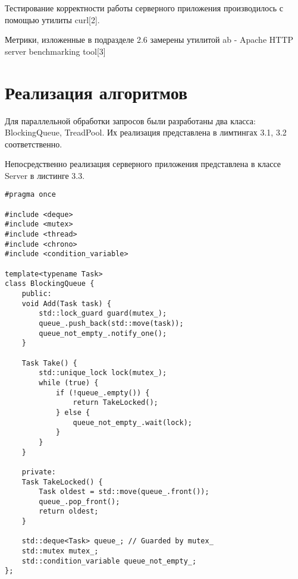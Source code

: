 Тестирование корректности работы серверного приложения производилось с помощью утилиты curl[2].

Метрики, изложенные в подразделе 2.6 замерены утилитой ab - Apache HTTP server benchmarking tool[3]

\section{Реализация алгоритмов}

Для параллельной обработки запросов были разработаны два класса: BlockingQueue, TreadPool. Их реализация представлена в лимтингах 3.1, 3.2 соответственно.

Непосредственно реализация серверного приложения представлена в классе Server в листинге 3.3. 

\begin{lstlisting}[caption=Реализация блокирующей очереди]
#pragma once

#include <deque>
#include <mutex>
#include <thread>
#include <chrono>
#include <condition_variable>

template<typename Task>
class BlockingQueue {
	public:
	void Add(Task task) {
		std::lock_guard guard(mutex_);
		queue_.push_back(std::move(task));
		queue_not_empty_.notify_one();
	}
	
	Task Take() {
		std::unique_lock lock(mutex_);
		while (true) {
			if (!queue_.empty()) {
				return TakeLocked();
			} else {
				queue_not_empty_.wait(lock);
			}
		}
	}
	
	private:
	Task TakeLocked() {
		Task oldest = std::move(queue_.front());
		queue_.pop_front();
		return oldest;
	}
	
	std::deque<Task> queue_; // Guarded by mutex_
	std::mutex mutex_;
	std::condition_variable queue_not_empty_;
};

\end{lstlisting}

